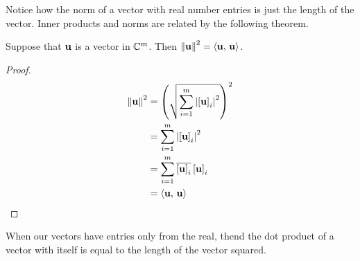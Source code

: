 \documentclass{ximera}
\begin{document}
Notice how the norm of a vector with real number entries is just the
length of the vector.  Inner products and norms are related by the
following theorem.

\begin{theorem}
\label{theorem:IPN}

Suppose that $\mathbf{u}$ is a vector in $\mathbb{C}^{m}$.  Then
$\left\lVert\mathbf{u}\right\rVert^2=\left\langle\mathbf{u},\,\mathbf{u}\right\rangle$.

\begin{proof}

  \begin{align*}
    \norm{\vect{u}}^2
    &=\left(\sqrt{\sum_{i=1}^{m}\modulus{\vectorentry{\vect{u}}{i}}^2}\right)^2
    \\ %
    &=\sum_{i=1}^{m}\modulus{\vectorentry{\vect{u}}{i}}^2
    \\ %
    &=\sum_{i=1}^{m}\conjugate{\vectorentry{\vect{u}}{i}}\vectorentry{\vect{u}}{i}
    \\ %
    &=\innerproduct{\vect{u}}{\vect{u}}
    \\ %
  \end{align*}

\end{proof}
\end{theorem}

When our vectors have entries only from the real, thend the dot
product of a vector with itself is equal to the length of the vector
squared.
\end{document}
